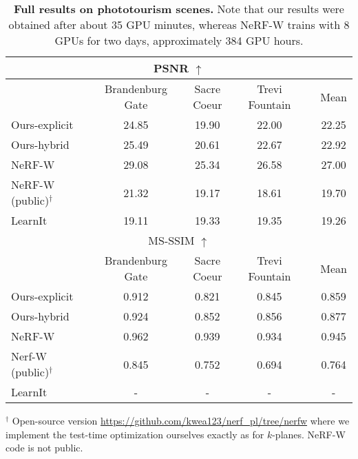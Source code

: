 \documentclass[10pt,twocolumn,letterpaper]{article}
\newcommand{\modelname}{$k$-planes}
\begin{document}
\renewcommand{\tabcolsep}{6pt}
\begin{table*}
  \centering
  \begin{tabular}{llccclc}
    \multicolumn{7}{c}{PSNR $\uparrow$} \\
    \toprule
     & & Brandenburg Gate & Sacre Coeur & Trevi Fountain & & Mean \\ 
     \cmidrule(){1-1} \cmidrule(){3-5} \cmidrule(){7-7}
     Ours-explicit && 24.85 & 19.90 & 22.00 && 22.25 \\
     Ours-hybrid && 25.49 & 20.61 & 22.67 && 22.92 \\
     NeRF-W~\cite{martinbrualla2020nerfw} && 29.08 & 25.34 & 26.58 && 27.00 \\
     NeRF-W (public)$^\dagger$ && 21.32 & 19.17 & 18.61 && 19.70 \\
     LearnIt \cite{learnit} && 19.11 & 19.33 & 19.35 && 19.26 \\
    \bottomrule 
    \multicolumn{7}{c}{MS-SSIM $\uparrow$} \\
    \toprule
    & & Brandenburg Gate & Sacre Coeur & Trevi Fountain & & Mean \\ 
    \cmidrule(){1-1} \cmidrule(){3-5} \cmidrule(){7-7}
    Ours-explicit && 0.912 & 0.821 & 0.845 && 0.859 \\
    Ours-hybrid && 0.924 & 0.852 & 0.856 && 0.877 \\
    NeRF-W && 0.962 & 0.939 & 0.934 && 0.945 \\
    Nerf-W (public)$^\dagger$ && 0.845 & 0.752 & 0.694 && 0.764 \\
    LearnIt && - & - & - && - \\ \bottomrule 

    
  \end{tabular}
    \vspace{-0.1cm}
    \begin{flushleft}
  {\footnotesize $^\dagger$ Open-source version \url{https://github.com/kwea123/nerf_pl/tree/nerfw} where we implement the test-time optimization ourselves exactly as for \modelname{}. NeRF-W code is not public.}
  \end{flushleft}
  \vspace{-0.4cm}
  \caption{\textbf{Full results on phototourism scenes.} Note that our results were obtained after about 35 GPU minutes, whereas NeRF-W trains with 8 GPUs for two days, approximately 384 GPU hours. }
  \label{tab:fullphototourism}
\end{table*}
 
\end{document}
